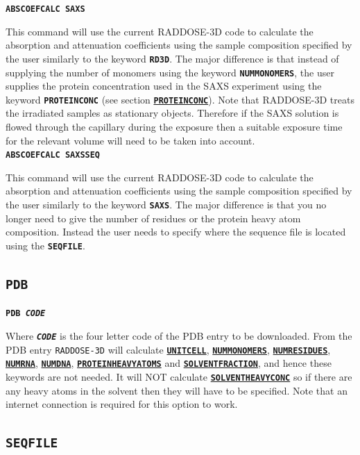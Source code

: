 \documentclass[a4paper]{article}
\newcommand{\RD}{\texttt{RADDOSE-3D}\xspace}
\newcommand{\Keyword}[1]{\texttt{\textbf{#1}}\xspace}
\newcommand{\SB}{\\[0.2em]}
\begin{document}
\noindent \Keyword{ABSCOEFCALC SAXS}

This command will use the current RADDOSE-3D code to calculate the absorption and attenuation coefficients using the sample composition specified by the user similarly to the keyword \Keyword{RD3D}. The major difference is that instead of supplying the number of monomers using the keyword \Keyword{NUMMONOMERS}, the user supplies the protein concentration used in the SAXS experiment using the keyword \Keyword{PROTEINCONC} (see section \hyperref[proteinconc]{\Keyword{PROTEINCONC}}).
\newline
Note that RADDOSE-3D treats the irradiated samples as stationary objects. Therefore if the SAXS solution is flowed through the capillary during the exposure then a suitable exposure time for the relevant volume will need to be taken into account.\SB

\noindent \Keyword{ABSCOEFCALC SAXSSEQ}

This command will use the current RADDOSE-3D code to calculate the absorption and attenuation coefficients using the sample composition specified by the user similarly to the keyword \Keyword{SAXS}. The major difference is that you no longer need to give the number of residues or the protein heavy atom composition. Instead the user needs to specify where the sequence file is located using the \Keyword{SEQFILE}.

\subsection{\Keyword{PDB}}
\label{pdb}

\noindent \Keyword{PDB \textit{CODE}}

Where \Keyword{\textit{CODE}} is the four letter code of the PDB entry to be downloaded. From the PDB entry \RD will calculate
 \hyperref[unitcell]{\Keyword{UNITCELL}},
 \hyperref[nummonomers]{\Keyword{NUMMONOMERS}},
 \hyperref[numresidues]{\Keyword{NUMRESIDUES}},
 \hyperref[numrna]{\Keyword{NUMRNA}},
 \hyperref[numdna]{\Keyword{NUMDNA}},
 \hyperref[proteinheavyatoms]{\Keyword{PROTEINHEAVYATOMS}} and
 \hyperref[solventfraction]{\Keyword{SOLVENTFRACTION}}, and hence these keywords are not needed.
It will NOT calculate \hyperref[solventheavyconc]{\Keyword{SOLVENTHEAVYCONC}} so if there are any heavy atoms in the solvent then they will have to be specified. Note that an internet connection is required for this option to work.

\subsection{\Keyword{SEQFILE}}
\label{seqfile}
\end{document}
